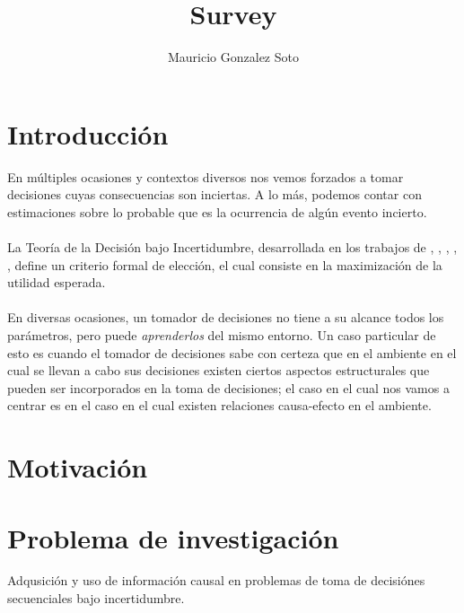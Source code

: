 \documentclass[11pt]{article}
\title{Survey}
\author{Mauricio Gonzalez Soto}
\theoremstyle{plain}
\begin{document}
\maketitle
\tableofcontents
\newpage
\section{Introducción}
En múltiples ocasiones y contextos diversos nos vemos forzados a tomar decisiones cuyas consecuencias son inciertas. A lo más, podemos contar con estimaciones sobre lo probable que es la ocurrencia de algún evento incierto.\\
\\
La Teoría de la Decisión bajo Incertidumbre, desarrollada en los trabajos de \cite{von1944theory}, \cite{definetti1930}, \cite{definetti1937}, \cite{savage1954the}, \cite{bernardo2000bayesian}, define un criterio formal de elección, el cual consiste en la maximización de la utilidad esperada.\\
\\
En diversas ocasiones, un tomador de decisiones no tiene a su alcance todos los parámetros, pero puede \textit{aprenderlos} del mismo entorno. Un caso particular de esto es cuando el tomador de decisiones sabe con certeza que en el ambiente en el cual se llevan a cabo sus decisiones existen ciertos aspectos estructurales que pueden ser incorporados en la toma de decisiones; el caso en el cual nos vamos a centrar es en el caso en el cual existen relaciones causa-efecto en el ambiente.
\section{Motivación}
\section{Problema de investigación}
Adqusición y uso de información causal en problemas de toma de decisiónes secuenciales bajo incertidumbre.
\end{document}
